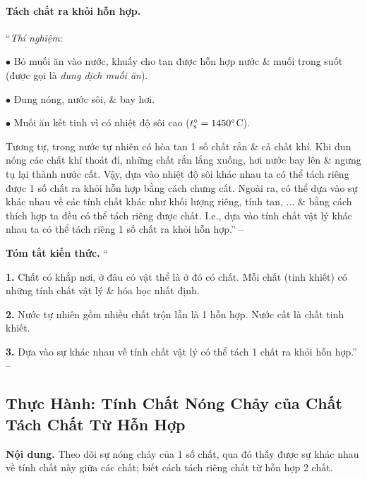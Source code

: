 \documentclass{article}
\numberwithin{equation}{section}
\begin{document}
\paragraph{Tách chất ra khỏi hỗn hợp.} ``\textit{Thí nghiệm}:
\begin{enumerate*}
	\item[$\bullet$] Bỏ muối ăn vào nước, khuấy cho tan được hỗn hợp nước \& muối trong suốt (được gọi là \textit{dung dịch muối ăn}).
	\item[$\bullet$] Đung nóng, nước sôi, \& bay hơi.
	\item[$\bullet$] Muối ăn kết tinh vì có nhiệt độ sôi cao ($t_{\rm s}^\circ = 1450^\circ$C).
\end{enumerate*}
Tương tự, trong nước tự nhiên có hòa tan 1 số chất rắn \& cả chất khí. Khi đun nóng các chất khí thoát đi, những chất rắn lắng xuống, hơi nước bay lên \& ngưng tụ lại thành nước cất. Vậy, dựa vào nhiệt độ sôi khác nhau ta có thể tách riêng được 1 số chất ra khỏi hỗn hợp bằng cách chưng cất. Ngoài ra, có thể dựa vào sự khác nhau về các tính chất khác như khối lượng riêng, tính tan, $\ldots$ \& bằng cách thích hợp ta đều có thể tách riêng được chất. I.e., dựa vào tính chất vật lý khác nhau ta có thể tách riêng 1 số chất ra khỏi hỗn hợp.'' -- \cite[p. 10]{SGK_Hoa_Hoc_8}
\vspace{2mm}

\noindent\textbf{Tóm tắt kiến thức.}
``\begin{enumerate*}
	\item[\textbf{1.}] Chất có khắp nơi, ở đâu có vật thể là ở đó có chất. Mỗi chất (tinh khiết) có những tính chất vật lý \& hóa học nhất định.
	\item[\textbf{2.}] Nước tự nhiên gồm nhiều chất trộn lẫn là 1 hỗn hợp. Nước cất là chất tinh khiết.
	\item[\textbf{3.}] Dựa vào sự khác nhau về tính chất vật lý có thể tách 1 chất ra khỏi hỗn hợp.'' -- \cite[p. 11]{SGK_Hoa_Hoc_8}
\end{enumerate*}


\subsection{Thực Hành: Tính Chất Nóng Chảy của Chất Tách Chất Từ Hỗn Hợp}
\textsf{\textbf{Nội dung.} Theo dõi sự nóng chảy của 1 số chất, qua đó thấy được sự khác nhau về tính chất này giữa các chất; biết cách tách riêng chất từ hỗn hợp 2 chất.}
\end{document}
